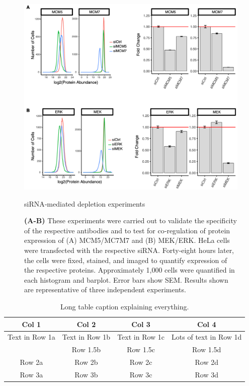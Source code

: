 \begin{figure}[hbt!]
\centering
\includegraphics[width=14cm, keepaspectratio]{figs/paper1/figS6.png}
\caption{siRNA‐mediated depletion experiments}
\caption*{\textbf{(A-B)} These experiments were carried out to validate the specificity of the respective antibodies and to test for co‐regulation of protein expression of (A) MCM5/MC7M7 and (B) MEK/ERK. HeLa cells were transfected with the respective siRNA. Forty‐eight hours later, the cells were fixed, stained, and imaged to quantify expression of the respective proteins. Approximately 1,000 cells were quantified in each histogram and barplot. Error bars show SEM. Results shown are representative of three independent experiments.
}
\label{fig:paper1_figS6}
\end{figure}


\renewcommand{\arraystretch}{2}  %
\begin{table}[hbt!]
\centering
\begin{tabularx}{\textwidth}{c|c|c|c}  %
   \textbf{Col 1} & \textbf{Col 2} & \textbf{Col 3} & \textbf{Col 4} \\
   \hline  %
   Text in Row 1a & Text in Row 1b & Text in Row 1c & Lots of text in Row 1d \\
                  & Row 1.5b & Row 1.5c & Row 1.5d \\
   \hline
   Row 2a & Row 2b & Row 2c & Row 2d \\
   \hline
   Row 3a & Row 3b & Row 3c & Row 3d \\
\end{tabularx}
\caption[Short table caption for List of Tables]{Long table caption explaining everything.}
\label{tab:paper1_tab1}
\end{table}
